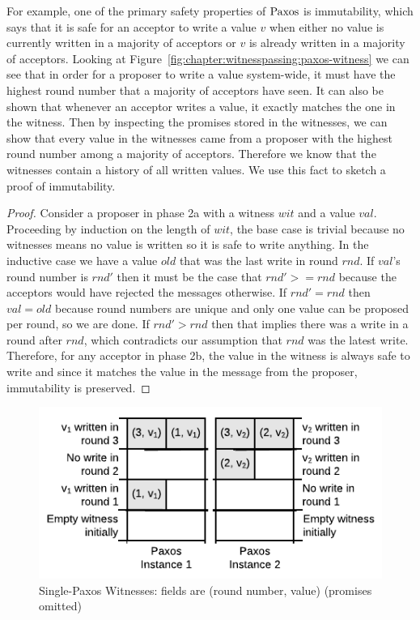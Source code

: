 For example, one of the primary safety properties of $\mathrm{Paxos}$ is immutability, which says that it
is safe for an acceptor to write a value $v$ when either no value is currently written in a
majority of acceptors or $v$ is already written in a majority of acceptors.
Looking at Figure~\ref{fig:chapter:witnesspassing:paxos-witness} we can see that in order for a proposer to write a value system-wide,
it must have the highest round number that a majority of acceptors have seen.
It can also be shown that whenever an acceptor writes a value, it exactly matches the one in the witness.
Then by inspecting the promises stored in the witnesses, we can show that every value in the witnesses
came from a proposer with the highest round number among a majority of acceptors.
Therefore we know that the witnesses contain a history of all written values.
We use this fact to sketch a proof of immutability.

\begin{proof}
Consider a proposer in phase 2a with a witness $wit$ and a value $val$.
Proceeding by induction on the length of $wit$, the base case is trivial because no witnesses
means no value is written so it is safe to write anything.
In the inductive case we have a value $old$ that was the last write in round $rnd$.
If $val$'s round number is $rnd'$ then it must be the case that $rnd' >= rnd$ because
the acceptors would have rejected the messages otherwise.
If $rnd' = rnd$ then $val = old$ because round numbers are unique and only one value can be proposed
per round, so we are done.
If $rnd' > rnd$ then that implies there was a write in a round after $rnd$, which contradicts our
assumption that $rnd$ was the latest write.
Therefore, for any acceptor in phase 2b, the value in the witness is always safe to write and since
it matches the value in the message from the proposer, immutability is preserved.
\end{proof}


\begin{figure}
\begin{center}
	\includegraphics[width=.7\textwidth, page=1]{figs/witnesspassing/witnessspmp}
\end{center}
\caption{Single-Paxos Witnesses: fields are (round number, value) (promises omitted)}
\label{fig:chapter:witnesspassing:paxos-witness-table}
\vspace{-1em}
\end{figure}


